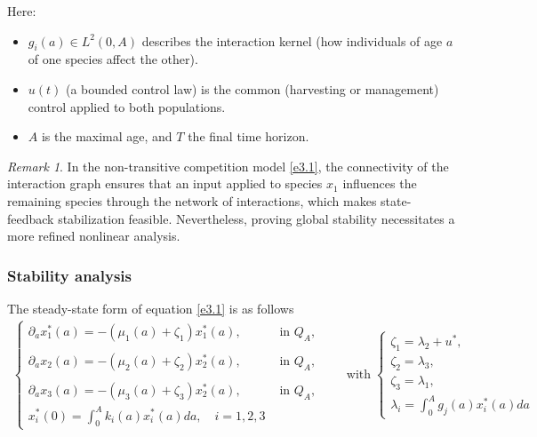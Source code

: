 \documentclass[10pt, a4paper]{amsart}
\theoremstyle{plain}
\theoremstyle{definition}
\theoremstyle{remark}
\newtheorem{remark}[lemma]{Remark}
\numberwithin{equation}{section}
\begin{document}
Here:
\begin{itemize}
\item  $g_i(a)\in L^2(0,A)$ describes the interaction kernel (how individuals of age $a$ of one species affect the other).
\item  $u(t)$ (a bounded control law) is the common (harvesting or management) control applied to both populations.
\item  $A$ is the maximal age, and $T$ the final time horizon.
\end{itemize}
\begin{remark}

In the non-transitive competition model \eqref{e3.1}, the connectivity of the interaction graph ensures that an input applied to species $x_1$ influences the remaining species through the network of interactions, which makes state-feedback stabilization feasible. Nevertheless, proving global stability necessitates a more refined nonlinear analysis.
\end{remark}
\subsubsection{\bf Stability analysis} \label{s3.1.2.2}
The steady-state form of equation \eqref{e3.1} is as follows
\begin{align}\label{e3.2}
\begin{cases}
\partial_ax^*_1(a)=-\left(\mu_1(a)+\zeta_1\right)x^*_1(a), & \text{ in } Q_A,\\[8pt]
\\\partial_ax_2(a)=-\left(\mu_2(a)+\zeta_2\right)x^*_2(a), & \text{ in } Q_A,\\[8pt]
\\\partial_ax_3(a)=-\left(\mu_3(a)+\zeta_3\right)x^*_2(a),& \text{ in } Q_A,\\[8pt]
x^*_i(0)=\displaystyle\int_0^Ak_i(a)x_i^*(a)da,\quad i=1,2,3
\end{cases}\qquad\text{with}\; \begin{cases}
\zeta_1=\lambda_2+u^*,\\ \zeta_2=\lambda_3,\\
\zeta_3=\lambda_1,\\
\lambda_i=\displaystyle\int_0^Ag_j(a)x^*_i(a)da
\end{cases}
\end{align}
\end{document}
